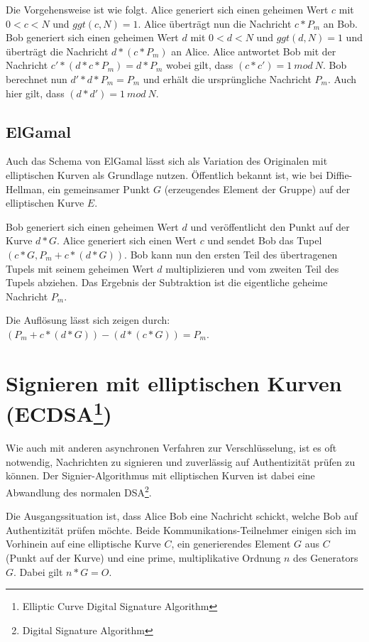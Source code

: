 Die Vorgehensweise ist wie folgt. Alice generiert sich einen geheimen Wert $c$ mit $0 < c < N$ und $ggt(c,N) = 1$.
Alice überträgt nun die Nachricht $c * P_m$ an Bob.
Bob generiert sich einen geheimen Wert $d$ mit $0 < d < N$ und $ggt(d,N) = 1$ und überträgt die Nachricht
$d * (c * P_m)$ an Alice.
Alice antwortet Bob mit der Nachricht $c' * (d * c * P_m) = d * P_m$ wobei gilt, dass $(c * c') = 1\ mod\ N$.
Bob berechnet nun $d' * d * P_m = P_m$ und erhält die ursprüngliche Nachricht $P_m$. Auch hier gilt, dass $(d * d') = 1\ mod\ N$.

\subsection{ElGamal}

Auch das Schema von ElGamal lässt sich als Variation des Originalen mit elliptischen Kurven als Grundlage nutzen.
Öffentlich bekannt ist, wie bei Diffie-Hellman, ein gemeinsamer Punkt $G$ (erzeugendes Element der Gruppe) auf der elliptischen Kurve $E$.

Bob generiert sich einen geheimen Wert $d$ und veröffentlicht den Punkt auf der Kurve $d * G$.
Alice generiert sich einen Wert $c$ und sendet Bob das Tupel $(c * G, P_m + c*(d*G))$. 
Bob kann nun den ersten Teil des übertragenen Tupels mit seinem geheimen Wert $d$ multiplizieren und vom zweiten Teil des Tupels abziehen.
Das Ergebnis der Subtraktion ist die eigentliche geheime Nachricht $P_m$.

Die Auflösung lässt sich zeigen durch: $(P_m + c * (d * G)) - (d * (c * G)) = P_m$.

\section{Signieren mit elliptischen Kurven (ECDSA\footnote{Elliptic Curve Digital Signature Algorithm})}

Wie auch mit anderen asynchronen Verfahren zur Verschlüsselung, ist es oft notwendig, Nachrichten zu signieren und
zuverlässig auf Authentizität prüfen zu können.
Der Signier-Algorithmus mit elliptischen Kurven ist dabei eine Abwandlung des normalen DSA\footnote{Digital Signature Algorithm}.

Die Ausgangssituation ist, dass Alice Bob eine Nachricht schickt, welche Bob auf Authentizität prüfen möchte.
Beide Kommunikations-Teilnehmer einigen sich im Vorhinein auf eine elliptische Kurve $C$, ein generierendes Element $G$ aus $C$ 
(Punkt auf der Kurve) und eine prime, multiplikative Ordnung $n$ des Generators $G$. Dabei gilt $n * G = O$.

